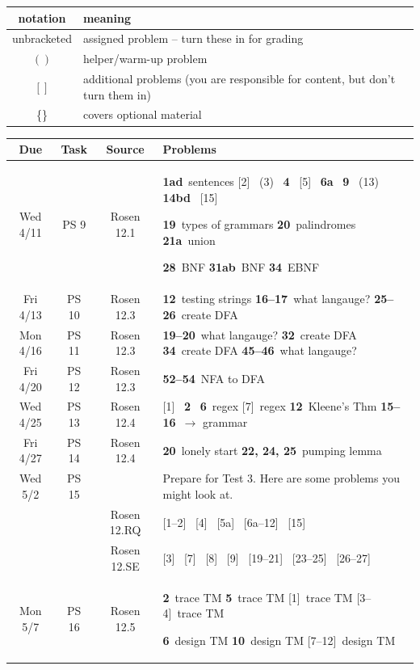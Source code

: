 \documentclass{scrartcl}\usepackage[]{graphicx}\usepackage[]{color}
\def\hwn#1{\relax}
\def\hwn#1{\ {\tiny (#1)}}
\def\hwn#1{$_{\mbox{\ \tiny #1}}$}
\def\hwn#1{~{\tiny #1}}
\newcommand{\helper}[2][\relax]{(#2)\hwn{#1}}
\newcommand{\extra}[2][\relax]{[#2]\hwn{#1}}
\newcommand{\mand}[2][\relax]{{\bf \large #2}\hwn{#1}}
\begin{document}
\begin{center}

\iftrue

\begin{longtable}{|c|l|}
  \hline
  notation & meaning \\
  \hline
  unbracketed & assigned problem -- turn these in for grading \\
  $()$ & helper/warm-up problem  \\
  $[]$ & additional problems (you are responsible for content, but don't turn them in) \\
  \{\} & covers optional material \\
  \hline
\end{longtable}
\fi

\bigskip


\begin{longtable}{|c|c|c|p{4.3in}|}
  \hline
  Due & Task & Source & Problems \\
  \hline\hline
  \endhead
  Wed 4/11 & PS 9 & Rosen 12.1 &
   \mand[sentences]{1ad}
	 \extra{2}
	 \helper{3}
	 \mand{4}
	 \extra{5}
	 \mand{6a}
	 \mand{9}
	 \helper{13}
	 \mand{14bd}
	 \extra{15}

	 \mand[types of grammars]{19}
	 \mand[palindromes]{20}
	 \mand[union]{21a}

	 \mand[BNF]{28}
	 \mand[BNF]{31ab}
	 \mand[EBNF]{34}
   \\
	   \hline
	   Fri 4/13 & PS 10 & Rosen 12.3 &
	   \mand[testing strings]{12}
	   \mand[what langauge?]{16--17}
	   \mand[create DFA]{25--26}
   \\
	   \hline
	   Mon 4/16 & PS 11 & Rosen 12.3 &
	   \mand[what langauge?]{19--20}
	   \mand[create DFA]{32}
	   \mand[create DFA]{34}
	   \mand[what langauge?]{45--46}
   \\
	   \hline
	   Fri 4/20 & PS 12 & Rosen 12.3 &
	   \mand[NFA to DFA]{52--54}
   \\
	   \hline
	   Wed 4/25 & PS 13 & Rosen 12.4 &
	   \extra{1}
	   \mand{2}
	   \mand[regex]{6}
	   \extra[regex]{7}
	   \mand[Kleene's Thm]{12}
	   \mand[$\to$ grammar]{15--16}
   \\
	   \hline
	   Fri 4/27 & PS 14 & Rosen 12.4 &
	   \mand[lonely start]{20}
	   \mand[pumping lemma]{22, 24, 25}
	   \\
	   \hline
	  Wed 5/2 & PS 15 & &
	  Prepare for Test 3.  Here are some problems you might look at.
	  \\
   & & Rosen 12.RQ &
   \extra{1--2}
   \extra{4}
   \extra{5a}
   \extra{6a--12}
   \extra{15}
   \\
   & & Rosen 12.SE &
   \extra{3}
   \extra{7}
   \extra{8}
   \extra{9}
   \extra{19--21}
   \extra{23--25}
   \extra{26--27}
   	   \\
	   \hline
	  Mon 5/7 & PS 16 & Rosen 12.5 &
	  \mand[trace TM]{2}
	  \mand[trace TM]{5}
	  \extra[trace TM]{1}
	  \extra[trace TM]{3--4}

	  \mand[design TM]{6}
	  \mand[design TM]{10}
	  \extra[design TM]{7--12}
	   \\
	   \hline
\end{longtable}
\end{center}
\label{end}
\end{document}
